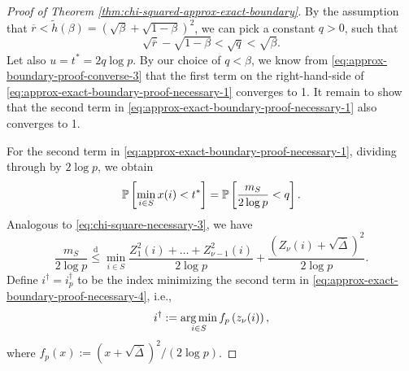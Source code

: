 \begin{proof}[Proof of Theorem \ref{thm:chi-squared-approx-exact-boundary}]
By the assumption that $\overline{r}<\widetilde{h}(\beta)=(\sqrt{\beta}+\sqrt{1-\beta})^2$, we can pick a constant $q>0$, such that 
\begin{equation} \label{eq:approx-exact-boundary-proof-necessary-2}
    \sqrt{\overline{r}} - \sqrt{1-\beta} < \sqrt{q} < \sqrt{\beta}.
\end{equation}
Let also $u = t^*=2q\log{p}$.
By our choice of $q < \beta$, we know from \eqref{eq:approx-boundary-proof-converse-3} that the first term on the right-hand-side of \eqref{eq:approx-exact-boundary-proof-necessary-1} converges to 1.
It remain to show that the second term in \eqref{eq:approx-exact-boundary-proof-necessary-1} also converges to 1.

For the second term in \eqref{eq:approx-exact-boundary-proof-necessary-1}, dividing through by $2\log{p}$, we obtain
\begin{equation} \label{eq:approx-exact-boundary-proof-necessary-3}
    \P\left[\min_{i\in S}x(i)<t^*\right] = \P\left[ \frac{m_{S}}{2\log{p}} < q \right].
\end{equation}
Analogous to \eqref{eq:chi-square-necessary-3}, we have
\begin{equation} \label{eq:approx-exact-boundary-proof-necessary-4}
    \frac{m_{S}}{2\log{p}} 
    \stackrel{\mathrm{d}}{\le} \min_{i\in S}\frac{Z_1^2(i) + \ldots + Z_{\nu-1}^2(i)}{2\log{p}} + \frac{(Z_\nu(i) + \sqrt{\overline{\Delta}})^2}{2\log{p}}.
\end{equation}
Define $i^\dagger = i^\dagger_p$ to be the index minimizing the second term in \eqref{eq:approx-exact-boundary-proof-necessary-4}, i.e.,
\begin{equation}
    i^\dagger := \argmin_{i\in S} f_p\left(z_\nu(i)\right),
\end{equation}
where $f_p(x):=(x+\sqrt{\overline{\Delta}})^2/(2\log{p})$. 


\end{proof}
